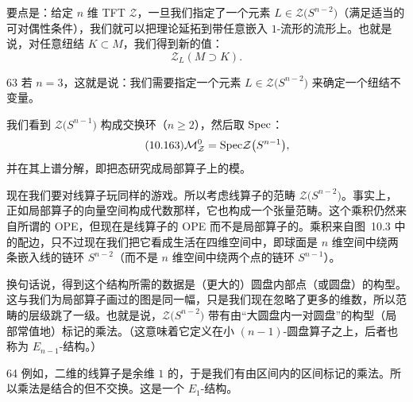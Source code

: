 要点是：给定 $n$ 维 TFT $\mathcal{Z}$，一旦我们指定了一个元素 $L\in\mathcal{Z}\big(S^{n-2}\big)$（满足适当的可对偶性条件），我们就可以把理论延拓到带任意嵌入 $1$-流形的流形上。也就是说，对任意纽结 $K\subset M$，我们得到新的值：
\begin{equation}\tag{10.162}
\mathcal{Z}_L(M\supset K).
\end{equation}

\begin{srcex}{63}
若 $n=3$，这就是说：我们需要指定一个元素 $L\in\mathcal{Z}\big(S^{n-2}\big)$ 来确定一个纽结不变量。
\end{srcex}

我们看到 $\mathcal{Z}\big(S^{n-1}\big)$ 构成交换环（$n\ge2$），然后取 $\mathrm{Spec}$：
\begin{equation}\tag{10.163}
\mathcal{M}_{\mathcal{Z}}^{0}=\mathrm{Spec}\mathcal{Z}\big(S^{n-1}\big),
\end{equation}
并在其上谱分解，即把态研究成局部算子上的模。

现在我们要对线算子玩同样的游戏。所以考虑线算子的范畴 $\mathcal{Z}\big(S^{n-2}\big)$。事实上，正如局部算子的向量空间构成代数那样，它也构成一个张量范畴。这个乘积仍然来自所谓的 OPE，但现在是线算子的 OPE 而不是局部算子的。乘积来自图~10.3 中的配边，只不过现在我们把它看成生活在四维空间中，即球面是 $n$ 维空间中绕两条嵌入线的链环 $S^{n-2}$（而不是 $n$ 维空间中绕两个点的链环 $S^{n-1}$）。

换句话说，得到这个结构所需的数据是（更大的）圆盘内部点（或圆盘）的构型。这与我们为局部算子画过的图是同一幅，只是我们现在忽略了更多的维数，所以范畴的层级跳了一级。也就是说，$\mathcal{Z}\big(S^{n-2}\big)$ 带有由“大圆盘内一对圆盘”的构型（局部常值地）标记的乘法。（这意味着它定义在小 $(n-1)$-圆盘算子之上，后者也称为 $E_{n-1}$-结构。）

\begin{srcex}{64}
例如，二维的线算子是余维 $1$ 的，于是我们有由区间内的区间标记的乘法。所以乘法是结合的但不交换。这是一个 $E_1$-结构。
\end{srcex}

